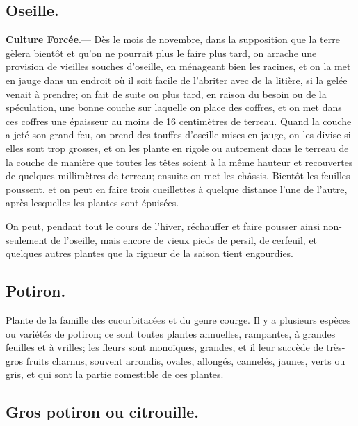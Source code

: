 \documentclass[10pt,a4paper]{book}
\begin{document}
\subsection{Oseille.}

\textbf{Culture Forcée}.--- Dès le mois de novembre, dans la supposition que la terre gèlera bientôt et qu'on ne pourrait plus le faire plus tard, on arrache une provision de vieilles souches d'oseille, en ménageant bien les racines, et on la met en jauge dans un endroit où il soit facile de l'abriter avec de la litière, si la gelée venait à prendre; on fait de suite ou plus tard, en raison du besoin ou de la spéculation, une bonne couche sur laquelle on place des coffres, et on met dans ces coffres une épaisseur au moins de 16 centimètres de terreau. Quand la couche a jeté son grand feu, on prend des touffes d'oseille mises en jauge, on les divise si elles sont trop grosses, et on les plante en rigole ou autrement dans le terreau de la couche de manière que toutes les têtes soient à la même hauteur et recouvertes de quelques millimètres de terreau; ensuite on met les châssis. Bientôt les feuilles poussent, et on peut en faire trois cueillettes à quelque distance l'une de l'autre, après lesquelles les plantes sont épuisées.

On peut, pendant tout le cours de l'hiver, réchauffer et faire pousser ainsi non-seulement de l'oseille, mais encore de vieux pieds de persil, de cerfeuil, et quelques autres plantes que la rigueur de la saison tient engourdies.

\subsection{Potiron.}

Plante de la famille des cucurbitacées et du genre courge. Il y a plusieurs espèces ou variétés de potiron; ce sont toutes plantes annuelles, rampantes, à grandes feuilles et à vrilles; les fleurs sont monoïques, grandes, et il leur succède de très-gros fruits charnus, souvent arrondis, ovales, allongés, cannelés, jaunes, verts ou gris, et qui sont la partie comestible de ces plantes.

\subsection{Gros potiron ou citrouille.}
\end{document}
